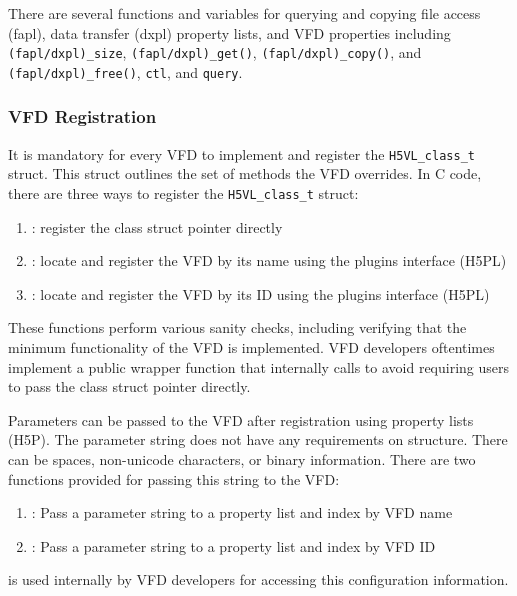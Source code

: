 There are several functions and variables for querying and copying file access (fapl), data transfer (dxpl) property lists, and VFD properties including \texttt{(fapl/dxpl)\_size}, \texttt{(fapl/dxpl)\_get()}, \texttt{(fapl/dxpl)\_copy()}, and \texttt{(fapl/dxpl)_free()}, \texttt{ctl}, and \texttt{query}.


\subsubsection{VFD Registration}

It is mandatory for every VFD to implement and register the \texttt{H5VL\_class\_t} struct. This struct outlines the set of methods the VFD overrides. In C code, there are three ways to register the \texttt{H5VL\_class\_t} struct:
\begin{enumerate}
    \item {}: register the class struct pointer directly
    \item {}: locate and register the VFD by its name using the plugins interface (H5PL)
    \item {}: locate and register the VFD by its ID using the plugins interface (H5PL)
\end{enumerate}
These functions perform various sanity checks, including verifying that the minimum functionality of the VFD is implemented. VFD developers oftentimes implement a public wrapper function that internally calls  to avoid requiring users to pass the class struct pointer directly.

Parameters can be passed to the VFD after registration using property lists (H5P). The parameter string does not have any requirements on structure. There can be spaces, non-unicode characters, or binary information.  There are two functions provided for passing this string to the VFD:
\begin{enumerate}
    \item {}: Pass a parameter string to a property list and index by VFD name
    \item {}: Pass a parameter string to a property list and index by VFD ID
\end{enumerate}
 is used internally by VFD developers for accessing this configuration information.

